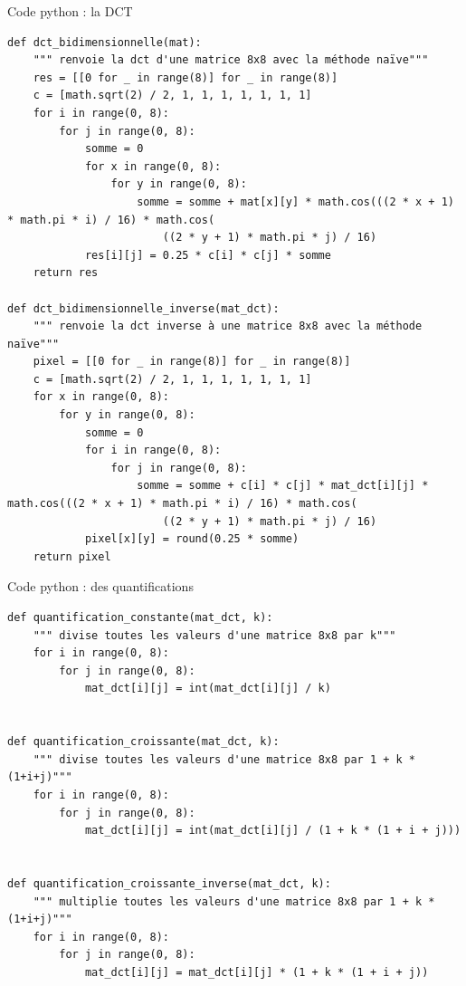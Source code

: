 \documentclass[xcolor=dvipsnames]{beamer}
\begin{document}
\begin{frame}[fragile]{Code python : la DCT}
    \begin{lstlisting}[style=pythonStyle]
def dct_bidimensionnelle(mat):
    """ renvoie la dct d'une matrice 8x8 avec la méthode naïve"""
    res = [[0 for _ in range(8)] for _ in range(8)]
    c = [math.sqrt(2) / 2, 1, 1, 1, 1, 1, 1, 1]
    for i in range(0, 8):
        for j in range(0, 8):
            somme = 0
            for x in range(0, 8):
                for y in range(0, 8):
                    somme = somme + mat[x][y] * math.cos(((2 * x + 1) * math.pi * i) / 16) * math.cos(
                        ((2 * y + 1) * math.pi * j) / 16)
            res[i][j] = 0.25 * c[i] * c[j] * somme
    return res

def dct_bidimensionnelle_inverse(mat_dct):
    """ renvoie la dct inverse à une matrice 8x8 avec la méthode naïve"""
    pixel = [[0 for _ in range(8)] for _ in range(8)]
    c = [math.sqrt(2) / 2, 1, 1, 1, 1, 1, 1, 1]
    for x in range(0, 8):
        for y in range(0, 8):
            somme = 0
            for i in range(0, 8):
                for j in range(0, 8):
                    somme = somme + c[i] * c[j] * mat_dct[i][j] * math.cos(((2 * x + 1) * math.pi * i) / 16) * math.cos(
                        ((2 * y + 1) * math.pi * j) / 16)
            pixel[x][y] = round(0.25 * somme)
    return pixel
    \end{lstlisting}
\end{frame}

\begin{frame}[fragile]{Code python : des quantifications}
    \begin{lstlisting}[style=pythonStyle]
def quantification_constante(mat_dct, k):
    """ divise toutes les valeurs d'une matrice 8x8 par k"""
    for i in range(0, 8):
        for j in range(0, 8):
            mat_dct[i][j] = int(mat_dct[i][j] / k)


def quantification_croissante(mat_dct, k):
    """ divise toutes les valeurs d'une matrice 8x8 par 1 + k * (1+i+j)"""
    for i in range(0, 8):
        for j in range(0, 8):
            mat_dct[i][j] = int(mat_dct[i][j] / (1 + k * (1 + i + j)))


def quantification_croissante_inverse(mat_dct, k):
    """ multiplie toutes les valeurs d'une matrice 8x8 par 1 + k * (1+i+j)"""
    for i in range(0, 8):
        for j in range(0, 8):
            mat_dct[i][j] = mat_dct[i][j] * (1 + k * (1 + i + j))

    \end{lstlisting}
\end{frame}
\end{document}
